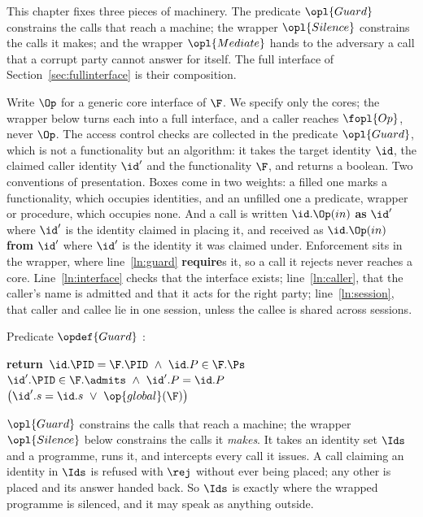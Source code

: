 \documentclass[10pt,oneside,openany]{book}
\theoremstyle{accentdef}
\theoremstyle{accentplain}
\begin{document}
This chapter fixes three pieces of machinery. The predicate $\opl{Guard}$ constrains the calls
that reach a machine; the wrapper $\opl{Silence}$ constrains the calls it makes; and the wrapper
$\opl{Mediate}$ hands to the adversary a call that a corrupt party cannot answer for itself. The
full interface of Section~\ref{sec:fullinterface} is their composition.

Write $\Op$ for a generic core interface of $\F$. We specify only the cores; the wrapper below
turns each into a full interface, and a caller reaches $\fopl{Op}$, never $\Op$. The access
control checks are collected in the predicate $\opl{Guard}$, which is not a functionality but an
algorithm: it takes the target identity $\id$, the claimed caller identity $\id'$ and the
functionality $\F$, and returns a boolean. Two conventions of presentation. Boxes come in two
weights: a filled one marks a functionality, which occupies identities, and an unfilled one a
predicate, wrapper or procedure, which occupies none. And a call is written
$\id.\Op(in)$ \textbf{as} $\id'$ where $\id'$ is the identity claimed in placing it, and received
as $\id.\Op(in)$ \textbf{from} $\id'$ where $\id'$ is the identity it was claimed under.
Enforcement sits in the wrapper, where
line~\ref{ln:guard} \textbf{require}s it, so a call it rejects never reaches a core.
Line~\ref{ln:interface} checks that the interface exists; line~\ref{ln:caller}, that the caller's
name is admitted and that it acts for the right party; line~\ref{ln:session}, that caller and
callee lie in one session, unless the callee is shared across sessions.


\begin{procedure}{Predicate $\opdef{Guard}$}
:
\begin{algorithmic}[1]
\State \textbf{return}\  $\id.\PID = \F.\PID \ \wedge\  \id.P \in \F.\Ps$
       \label{ln:interface}
\State \algand\  $\id'.\PID \in \F.\admits \ \wedge\  \id'.P = \id.P$
       \label{ln:caller}
\State \algand\  $\bigl(\id'.s = \id.s \ \vee\ \op{global}(\F)\bigr)$
       \label{ln:session}
\end{algorithmic}
\end{procedure}

$\opl{Guard}$ constrains the calls that reach a machine; the wrapper $\opl{Silence}$ below
constrains the calls it \emph{makes}. It takes an identity set $\Ids$ and a programme, runs it,
and intercepts every call it issues. A call claiming an identity in $\Ids$ is refused
with $\rej$ without ever being placed; any other is placed and its answer handed back. So $\Ids$
is exactly where the wrapped programme is silenced, and it may speak as anything outside.
\end{document}
